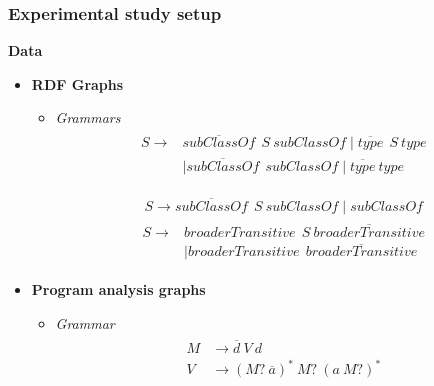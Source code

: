 \documentclass{beamer}
\begin{document}
  
  \begin{frame}
\transwipe[direction=90]
 \frametitle{Experimental study setup}
 \textbf{Data}
 \begin{itemize}
     \item \textbf{RDF Graphs}
     \begin{itemize}
         \item \textit{Grammars}
  \begin{align}
\begin{split}
\label{eqn:g_1}
S \to & \overline{\textit{subClassOf}} \ \ S \ \textit{subClassOf} \mid \overline{\textit{type}} \ \ S \ \textit{type}\\   & \mid \overline{\textit{subClassOf}} \ \ \textit{subClassOf} \mid \overline{\textit{type}} \ \textit{type}
\end{split}
 \tag{$G_1$}
\end{align}

\begin{align}
\label{eqn:g_2}
S \to \overline{\textit{subClassOf}} \ \ S \ \textit{subClassOf} \mid \textit{subClassOf}
 \tag{$G_2$}
\end{align}
\begin{align}
\begin{split}
\label{eqn:geo}
S \to & \textit{broaderTransitive} \ \  S \ \overline{\textit{broaderTransitive}} \\
      & \mid \textit{broaderTransitive} \ \  \overline{\textit{broaderTransitive}}
\end{split}
 \tag{$Geo$}
\end{align}
     \end{itemize}
     \item \textbf{Program analysis graphs}
     \begin{itemize}
         \item 
         \textit{Grammar}
         \begin{align}
\begin{split}
\label{eqn:points_to}
M & \to \overline{d} \ V \ d \\
V & \to (M? \ \overline{a})^* \ M? \ (a \ M?)^* 
\end{split}
 \tag{$PointsTo$}
\end{align}
     \end{itemize}
  \end{itemize}
 \end{frame}
  
\end{document}
